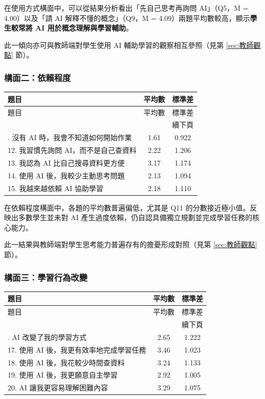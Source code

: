 在使用方式構面中，可以從結果分析看出「先自己思考再詢問 AI」（Q5，M = 4.00）以及「請 AI 解釋不懂的概念」（Q9，M = 4.09）兩題平均數較高，顯示\textbf{學生較常將 AI 用於概念理解與學習輔助}。

此一傾向亦可與教師端對學生使用 AI 輔助學習的觀察相互參照（見第 \ref{sec:教師觀點} 節）。


\subsubsection{構面二：依賴程度}\label{sec:構面二}

\begin{longtable}{l c c}
\toprule
題目 & 平均數 & 標準差 \\
\midrule
\endfirsthead
\toprule
題目 & 平均數 & 標準差 \\
\midrule
\endhead
\midrule
\multicolumn{3}{r}{續下頁} \\
\endfoot
\bottomrule
\endlastfoot
11. 沒有 AI 時，我會不知道如何開始作業 & 1.61 & 0.922 \\
12. 我習慣先詢問 AI，而不是自己查資料 & 2.22 & 1.206 \\
13. 我認為 AI 比自己搜尋資料更方便 & 3.17 & 1.174 \\
14. 使用 AI 後，我較少主動思考問題 & 2.13 & 1.094 \\
15. 我越來越依賴 AI 協助學習 & 2.18 & 1.110 \\
\end{longtable}

在依賴程度構面中，各題的平均數普遍偏低，尤其是 Q11 的分數接近極小值。反映出多數學生並未對 AI 產生過度依賴，仍自認具備獨立規劃並完成學習任務的核心能力。

此一結果與教師端對學生思考能力普遍存有的擔憂形成對照（見第 \ref{sec:教師觀點} 節）。


\subsubsection{構面三：學習行為改變}\label{sec:構面三}

\begin{longtable}{l c c}
\toprule
題目 & 平均數 & 標準差 \\
\midrule
\endfirsthead
\toprule
題目 & 平均數 & 標準差 \\
\midrule
\endhead
\midrule
\multicolumn{3}{r}{續下頁} \\
\endfoot
\bottomrule
\endlastfoot
16. AI 改變了我的學習方式 & 2.65 & 1.222 \\
17. 使用 AI 後，我更有效率地完成學習任務 & 3.46 & 1.023 \\
18. 使用 AI 後，我花較少時間查資料 & 3.24 & 1.133 \\
19. 使用 AI 後，我更願意自主學習 & 2.92 & 1.005 \\
20. AI 讓我更容易理解困難內容 & 3.29 & 1.075 \\
\end{longtable}

